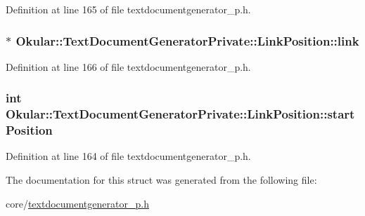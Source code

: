 Definition at line 165 of file textdocumentgenerator\+\_\+p.\+h.

\hypertarget{structOkular_1_1TextDocumentGeneratorPrivate_1_1LinkPosition_a28f22efca06cf1df74ae313225771b63}{
\subsubsection[{link}]{$\ast$ Okular\+::\+Text\+Document\+Generator\+Private\+::\+Link\+Position\+::link}}\label{structOkular_1_1TextDocumentGeneratorPrivate_1_1LinkPosition_a28f22efca06cf1df74ae313225771b63}


Definition at line 166 of file textdocumentgenerator\+\_\+p.\+h.

\hypertarget{structOkular_1_1TextDocumentGeneratorPrivate_1_1LinkPosition_ab4fe30fdf9d7e281f30387190411a086}{
\subsubsection[{start\+Position}]{\setlength{\rightskip}{0pt plus 5cm}int Okular\+::\+Text\+Document\+Generator\+Private\+::\+Link\+Position\+::start\+Position}}\label{structOkular_1_1TextDocumentGeneratorPrivate_1_1LinkPosition_ab4fe30fdf9d7e281f30387190411a086}


Definition at line 164 of file textdocumentgenerator\+\_\+p.\+h.



The documentation for this struct was generated from the following file\+:\begin{DoxyCompactItemize}
\item 
core/\hyperlink{textdocumentgenerator__p_8h}{textdocumentgenerator\+\_\+p.\+h}\end{DoxyCompactItemize}
